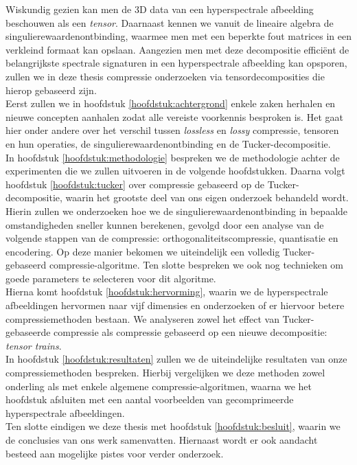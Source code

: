 Wiskundig gezien kan men de 3D data van een hyperspectrale afbeelding beschouwen als een \textit{tensor}. Daarnaast kennen we vanuit de lineaire algebra de singulierewaardenontbinding, waarmee men met een beperkte fout matrices in een verkleind formaat kan opslaan. Aangezien men met deze decompositie effici\"ent de belangrijkste spectrale signaturen in een hyperspectrale afbeelding kan opsporen, zullen we in deze thesis compressie onderzoeken via tensordecomposities die hierop gebaseerd zijn.\\

Eerst zullen we in hoofdstuk \ref{hoofdstuk:achtergrond} enkele zaken herhalen en nieuwe concepten aanhalen zodat alle vereiste voorkennis besproken is. Het gaat hier onder andere over het verschil tussen \textit{lossless} en \textit{lossy} compressie, tensoren en hun operaties, de singulierewaardenontbinding en de Tucker-decompositie.\\

In hoofdstuk \ref{hoofdstuk:methodologie} bespreken we de methodologie achter de experimenten die we zullen uitvoeren in de volgende hoofdstukken. Daarna volgt hoofdstuk \ref{hoofdstuk:tucker} over compressie gebaseerd op de Tucker-decompositie, waarin het grootste deel van ons eigen onderzoek behandeld wordt. Hierin zullen we onderzoeken hoe we de singulierewaardenontbinding in bepaalde omstandigheden sneller kunnen berekenen, gevolgd door een analyse van de volgende stappen van de compressie: orthogonaliteitscompressie, quantisatie en encodering. Op deze manier bekomen we uiteindelijk een volledig Tucker-gebaseerd compressie-algoritme. Ten slotte bespreken we ook nog technieken om goede parameters te selecteren voor dit algoritme.\\

Hierna komt hoofdstuk \ref{hoofdstuk:hervorming}, waarin we de hyperspectrale afbeeldingen hervormen naar vijf dimensies en onderzoeken of er hiervoor betere compressiemethoden bestaan. We analyseren zowel het effect van Tucker-gebaseerde compressie als compressie gebaseerd op een nieuwe decompositie: \textit{tensor trains}.\\

In hoofdstuk \ref{hoofdstuk:resultaten} zullen we de uiteindelijke resultaten van onze compressiemethoden bespreken. Hierbij vergelijken we deze methoden zowel onderling als met enkele algemene compressie-algoritmen, waarna we het hoofdstuk afsluiten met een aantal voorbeelden van gecomprimeerde hyperspectrale afbeeldingen.\\

Ten slotte eindigen we deze thesis met hoofdstuk \ref{hoofdstuk:besluit}, waarin we de conclusies van ons werk samenvatten. Hiernaast wordt er ook aandacht besteed aan mogelijke pistes voor verder onderzoek.